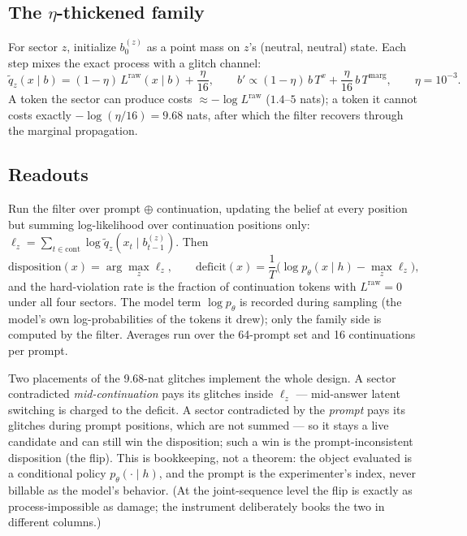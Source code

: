 \documentclass[11pt]{article}
\begin{document}
\subsection{The $\eta$-thickened family}

For sector $z$, initialize $b^{(z)}_0$ as a point mass on $z$'s (neutral, neutral) state.
Each step mixes the exact process with a glitch channel:
\begin{equation}
  \tilde q_z(x\mid b)=(1-\eta)\,L^{\mathrm{raw}}(x\mid b)+\frac{\eta}{16},
  \qquad
  b' \propto (1-\eta)\,b\,T^x+\frac{\eta}{16}\,b\,T^{\mathrm{marg}},
  \qquad \eta=10^{-3}.
\end{equation}
A token the sector can produce costs $\approx-\log L^{\mathrm{raw}}$ ($1.4$--$5$ nats); a
token it cannot costs exactly $-\log(\eta/16)=9.68$ nats, after which the filter recovers
through the marginal propagation.

\subsection{Readouts}

Run the filter over prompt $\oplus$ continuation, updating the belief at every position but
summing log-likelihood over continuation positions only:
$\ell_z=\sum_{t\in\mathrm{cont}}\log\tilde q_z(x_t\mid b^{(z)}_{t-1})$. Then
\begin{equation}
  \mathrm{disposition}(x)=\arg\max_z \ell_z,
  \qquad
  \mathrm{deficit}(x)=\frac{1}{T}\Big(\log p_\theta(x\mid h)-\max_z \ell_z\Big),
\end{equation}
and the hard-violation rate is the fraction of continuation tokens with
$L^{\mathrm{raw}}=0$ under all four sectors. The model term $\log p_\theta$ is recorded
during sampling (the model's own log-probabilities of the tokens it drew); only the family
side is computed by the filter. Averages run over the 64-prompt set and 16 continuations per
prompt.

Two placements of the 9.68-nat glitches implement the whole design. A sector contradicted
\emph{mid-continuation} pays its glitches inside $\ell_z$ --- mid-answer latent switching is
charged to the deficit. A sector contradicted by the \emph{prompt} pays its glitches during
prompt positions, which are not summed --- so it stays a live candidate and can still win the
disposition; such a win is the prompt-inconsistent disposition (the flip). This is
bookkeeping, not a theorem: the object evaluated is a conditional policy
$p_\theta(\cdot\mid h)$, and the prompt is the experimenter's index, never billable as the
model's behavior. (At the joint-sequence level the flip is exactly as process-impossible as
damage; the instrument deliberately books the two in different columns.)
\end{document}
